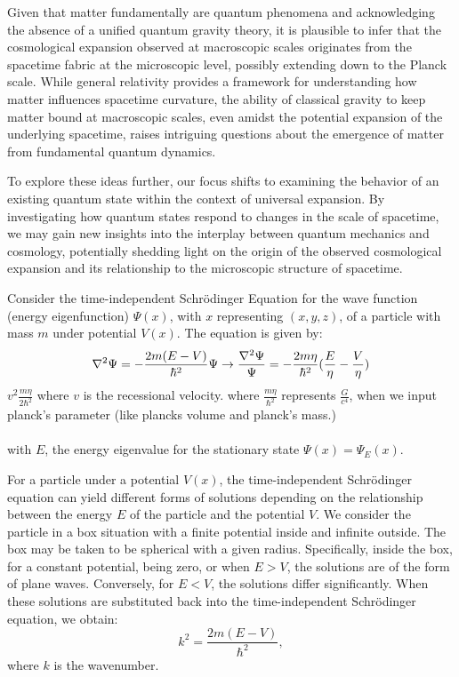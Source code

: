 \documentclass{article}
\begin{document}
Given that matter fundamentally are quantum phenomena and acknowledging the absence of a unified quantum gravity theory, it is plausible to infer that the cosmological expansion observed at macroscopic scales originates from the spacetime fabric at the microscopic level, possibly extending down to the Planck scale. While general relativity provides a framework for understanding how matter influences spacetime curvature, the ability of classical gravity to keep matter bound at macroscopic scales, even amidst the potential expansion of the underlying spacetime, raises intriguing questions about the emergence of matter from fundamental quantum dynamics.

To explore these ideas further, our focus shifts to examining the behavior of an existing quantum state within the context of universal expansion. By investigating how quantum states respond to changes in the scale of spacetime, we may gain new insights into the interplay between quantum mechanics and cosmology, potentially shedding light on the origin of the observed cosmological expansion and its relationship to the microscopic structure of spacetime.

Consider the time-independent Schr{\"o}dinger Equation for the wave function (energy eigenfunction) $\Psi(x)$, with $x$ representing $(x,y,z)$, of a particle with mass $m$ under potential $V(x)$. The equation is given by:
\begin{equation}
\nabla^2 \Psi = -\frac{2m(E - V)}{\hbar^2} \Psi \quad \label{eq1Schrodinger} \\ 
\rightarrow
\frac{\nabla^2 \Psi}{\Psi} = -\frac{2m\eta}{\hbar^2}(\frac{E}{\eta} - \frac{V}{\eta})  
\end{equation}
$v^2\frac{m\eta}{2\hbar^2}$ where $v$ is the recessional velocity. where $\frac{m\eta}{\hbar^2}$ represents $\frac{G}{c^4}$, when we input planck's parameter (like plancks volume and planck's mass.)\\ \\
with $E$, the energy eigenvalue for the stationary state $\Psi(x)=\Psi_{E}(x)$.

For a particle under a potential $V(x)$, the time-independent Schr{\"o}dinger equation can yield different forms of solutions depending on the relationship between the energy $E$ of the particle and the potential $V$. We consider the particle in a box situation with a finite potential inside and infinite outside. The box may be taken to be spherical with a given radius. Specifically, inside the box, for a constant potential, being zero, or when $E > V$, the solutions are of the form of plane waves. Conversely, for $E < V$, the solutions differ significantly. When these solutions are substituted back into the time-independent Schr{\"o}dinger equation, we obtain:
\begin{equation}
k^2 = \frac{2m(E-V)}{\hbar^2}, \label{eq2KEV}
\end{equation}
where $k$ is the wavenumber. 
\end{document}
